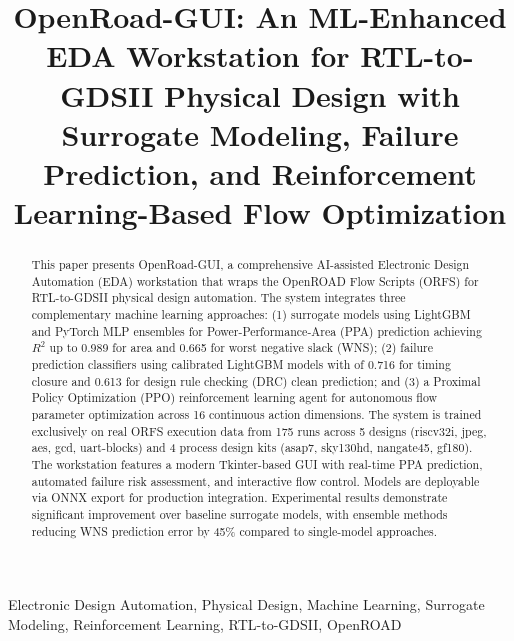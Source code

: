\documentclass[10pt,conference]{IEEEtran}
\newcommand{\Rtwo}{$R^2$}
\newcommand{\AUC}{\text{AUC}}
\begin{document}
\title{OpenRoad-GUI: An ML-Enhanced EDA Workstation for RTL-to-GDSII Physical Design with Surrogate Modeling, Failure Prediction, and Reinforcement Learning-Based Flow Optimization}

\author{
}

\maketitle


\begin{abstract}
This paper presents OpenRoad-GUI, a comprehensive AI-assisted Electronic Design Automation (EDA) workstation that wraps the OpenROAD Flow Scripts (ORFS) for RTL-to-GDSII physical design automation. The system integrates three complementary machine learning approaches: (1) surrogate models using LightGBM and PyTorch MLP ensembles for Power-Performance-Area (PPA) prediction achieving \Rtwo{} up to 0.989 for area and 0.665 for worst negative slack (WNS); (2) failure prediction classifiers using calibrated LightGBM models with \AUC{} of 0.716 for timing closure and 0.613 for design rule checking (DRC) clean prediction; and (3) a Proximal Policy Optimization (PPO) reinforcement learning agent for autonomous flow parameter optimization across 16 continuous action dimensions. The system is trained exclusively on real ORFS execution data from 175 runs across 5 designs (riscv32i, jpeg, aes, gcd, uart-blocks) and 4 process design kits (asap7, sky130hd, nangate45, gf180). The workstation features a modern Tkinter-based GUI with real-time PPA prediction, automated failure risk assessment, and interactive flow control. Models are deployable via ONNX export for production integration. Experimental results demonstrate significant improvement over baseline surrogate models, with ensemble methods reducing WNS prediction error by 45\% compared to single-model approaches.
\end{abstract}

\begin{IEEEkeywords}
Electronic Design Automation, Physical Design, Machine Learning, Surrogate Modeling, Reinforcement Learning, RTL-to-GDSII, OpenROAD
\end{IEEEkeywords}
\end{document}
